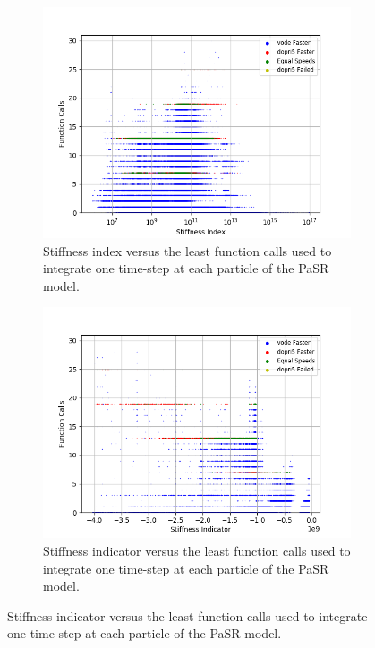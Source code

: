 \documentclass[12pt]{ussci}
\begin{document}
\begin{figure}[htbp]
\begin{subfigure}{0.43\textwidth}
       \label{fig:SRGRIPaSR}
   \end{subfigure}
   \begin{subfigure}{0.43\textwidth}
       \includegraphics[width=\linewidth]{GRI_Mech_3/PaSR_Fn_Work_Index_Groupings_1e-09.png}
       \caption{Stiffness index versus the least function calls used to integrate one time-step at each particle of the PaSR model.}
       \label{fig:SI1GRIPaSR}
   \end{subfigure}
   \hfill
   \begin{subfigure}{0.43\textwidth}
       \includegraphics[width=\linewidth]{GRI_Mech_3/PaSR_Fn_Work_Indicator_Groupings_1e-09.png}
       \caption{Stiffness indicator versus the least function calls used to integrate one time-step at each particle of the PaSR model.}

\end{subfigure}
\end{figure}
\end{document}

